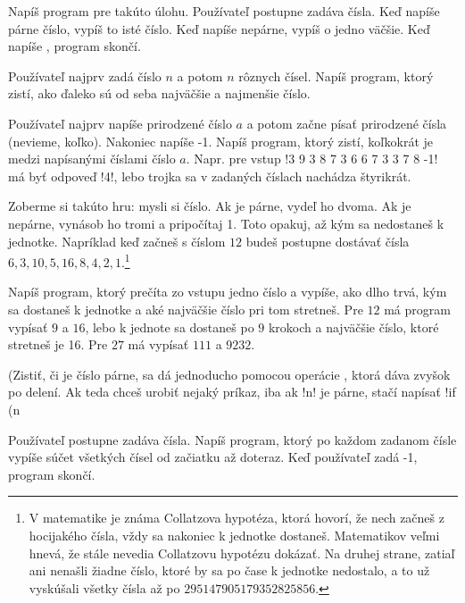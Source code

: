 \begin{uloha}
  Napíš program pre takúto úlohu.
  Používateľ postupne zadáva čísla. Keď napíše párne číslo, vypíš to isté číslo.
  Keď napíše nepárne, vypíš o jedno väčšie.
  Keď napíše , program skončí.
\end{uloha}

\begin{uloha}
  Používateľ najprv zadá číslo $n$ a potom $n$ rôznych čísel. Napíš program, ktorý zistí,
  ako ďaleko sú od seba najväčšie a najmenšie číslo.
\end{uloha}

\begin{uloha}
  Používateľ najprv napíše prirodzené číslo $a$ a potom začne písať
  prirodzené čísla (nevieme, koľko). Nakoniec napíše -1.
  Napíš program, ktorý zistí, koľkokrát je medzi napísanými číslami
  číslo $a$. Napr. pre vstup \prg!3 9 3 8 7 3 6 6 7 3 3 7 8 -1!
  má byť odpoveď \prg!4!, lebo trojka sa v zadaných číslach 
  nachádza štyrikrát.
\end{uloha}

\begin{uloha}
  \label{uloha:collatz}
  Zoberme si takúto hru: mysli si číslo. Ak je párne, vydeľ ho dvoma. Ak je nepárne,
  vynásob ho tromi a pripočítaj 1. Toto opakuj, až kým sa nedostaneš k jednotke.
  Napríklad keď začneš s číslom $12$ budeš postupne dostávať čísla
  $6, 3, 10, 5, 16, 8, 4, 2, 1$.\footnote{V matematike je známa%
  Collatzova hypotéza, ktorá 
  hovorí, že nech začneš z hocijakého čísla, vždy sa nakoniec k jednotke dostaneš.
  Matematikov veľmi hnevá, že stále nevedia Collatzovu hypotézu dokázať.
  Na druhej strane, zatiaľ ani nenašli žiadne číslo, ktoré
  by sa po čase k jednotke nedostalo, a to už vyskúšali všetky čísla až po
  $295147905179352825856$. }

  Napíš program, ktorý prečíta zo vstupu jedno číslo a vypíše, ako dlho trvá, kým
  sa dostaneš k jednotke a aké najväčšie číslo pri tom stretneš. Pre $12$
  má program vypísať $9$ a $16$, lebo k jednote sa dostaneš po $9$ krokoch a 
  najväčšie číslo, ktoré stretneš je 16. Pre $27$ má vypísať $111$ a $9232$.

  (Zistiť, či je číslo párne, sa dá jednoducho pomocou operácie \vb{\%}, ktorá
  dáva zvyšok po delení. Ak teda chceš urobiť nejaký príkaz, iba ak \prg!n!
  je párne, stačí napísať \prg!if (n %
\end{uloha}

\begin{uloha} Používateľ postupne zadáva čísla. Napíš program, ktorý
  po každom zadanom čísle vypíše súčet všetkých čísel od začiatku až doteraz.
  Keď používateľ zadá -1, program skončí.
\end{uloha}

